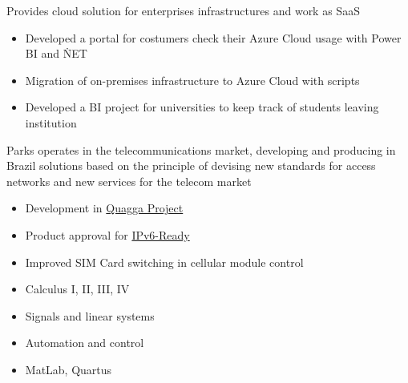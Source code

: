 \documentclass[10pt,a4paper]{altacv}
\begin{document}
\divider{}

Provides cloud solution for enterprises infrastructures and work as SaaS
\begin{itemize}
\item Developed a portal for costumers check their Azure Cloud usage with Power BI and \.NET
\item Migration of on-premises infrastructure to Azure Cloud with scripts
\item Developed a BI project for universities to keep track of students leaving institution
\end{itemize}

\divider{}

Parks operates in the telecommunications market, developing and producing in Brazil solutions based on the principle of devising new standards for access networks and new services for the telecom market
\begin{itemize}
\item Development in \href{https://www.quagga.net/}{Quagga Project}
\item Product approval for \href{https://www.ipv6ready.org/}{IPv6-Ready}
\item Improved SIM Card switching in cellular module control
\end{itemize}


\begin{itemize}
\item Calculus I, II, III, IV
\item Signals and linear systems
\item Automation and control
\item MatLab, Quartus
\end{itemize}

\clearpage
\end{document}
